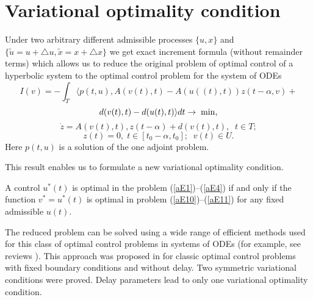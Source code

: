 \documentclass[12pt]{llncs}
\begin{document}
\section{Variational optimality condition}
%
Under two arbitrary different admissible processes $\{u,x\}$ and $ \{\tilde{u}=u+ \triangle u, \tilde{x}=x+ \triangle x\}$ we get exact increment formula (without remainder terms) which allows us to reduce the original problem of optimal control of a hyperbolic system to the optimal control problem for the system of ODEs
$$
I(v)= - \int_{T} \langle p(t, u), A(v(t), t) - A(u((t), t))z(t-\alpha, v) +
$$
\begin{equation} \label{aE10}
d(v(t), t) - d(u(t), t) \rangle dt \rightarrow \; {\rm min},
\end{equation}
\begin{equation} \label{aE11}
\dot{z} = A(v(t), t), z(t-\alpha)+ d(v(t), t) ,  \;\; t\in T;
\end{equation}
$$
z(t) = 0, \; t \in [t_0-\alpha, t_0]; \;\;  v(t) \in U.
$$
Here $p(t,u)$ is a solution of the one adjoint problem.

This result enables us to formulate a new variational optimality condition.

\begin{theorem}
A control $u^{*}(t)$ is optimal in the problem  (\ref{aE1})--(\ref{aE4}) if and only if the function $v^{*}=u^{*}(t)$  is optimal in problem (\ref{aE10})--(\ref{aE11}) for any fixed admissible $u(t)$.
\end{theorem}

The reduced problem can be solved using a wide range of efficient methods used for this class of optimal control problems in systems of ODEs (for example, see reviews \cite{Gol,B,Sr}). This approach was proposed in \cite{Arg1} for classic optimal control problems with fixed boundary conditions and without delay. Two symmetric variational conditions were proved. Delay parameters lead to only one variational optimality condition.
\end{document}
